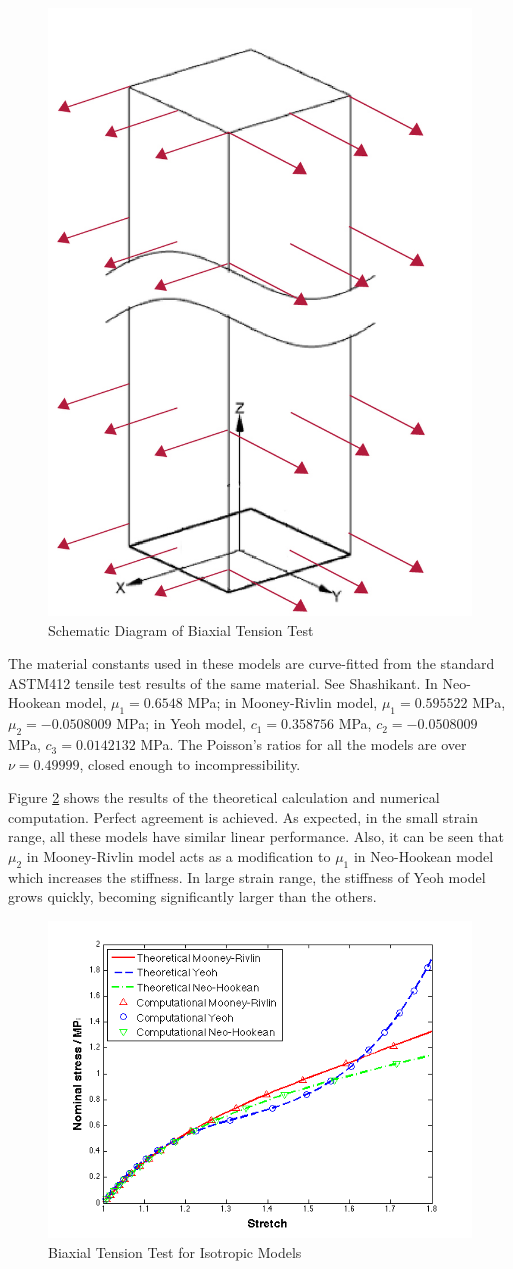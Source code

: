 \begin{figure}[h!]
\centering
\includegraphics[width=.3\textwidth]{./figures/biaxial_schematic.jpg}
\caption{Schematic Diagram of Biaxial Tension Test}
\label{fig:biaxial_schematic}
\end{figure}

The material constants used in these models are curve-fitted from the standard ASTM412 tensile test results of the same material. See Shashikant. In Neo-Hookean model, $\mu_1 = 0.6548$ MPa; in Mooney-Rivlin model, $\mu_1 = 0.595522$ MPa, $\mu_2 = -0.0508009$ MPa; in Yeoh model, $c_1 = 0.358756$ MPa, $c_2 = - 0.0508009$ MPa, $c_3 = 0.0142132$ MPa. The Poisson's ratios for all the models are over $\nu = 0.49999$, closed enough to incompressibility.

Figure \ref{fig:biaxial1} shows the results of the theoretical calculation and numerical computation. Perfect agreement is achieved. As expected, in the small strain range, all these models have similar linear performance. Also, it can be seen that $\mu_2$ in Mooney-Rivlin model acts as a modification to $\mu_1$ in Neo-Hookean model which increases the stiffness. In large strain range, the stiffness of Yeoh model grows quickly, becoming significantly larger than the others.

\begin{figure}[h!]
\centering
\includegraphics[width=.6\textwidth]{./figures/biaxial1.png}
\caption{Biaxial Tension Test for Isotropic Models}
\label{fig:biaxial1}
\end{figure}

